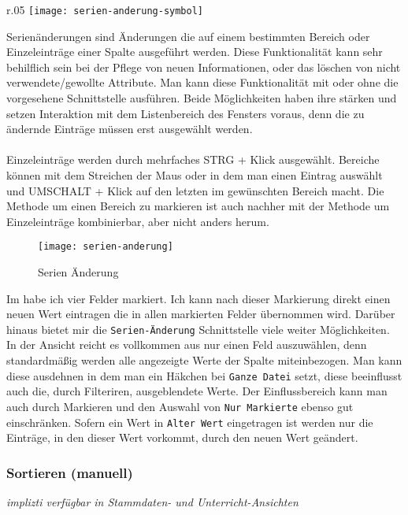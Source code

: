 \begin{wrapfigure}{r}{.05\textwidth}
	\vspace{-50pt}
	\texttt{[image: serien-anderung-symbol]}
	\vspace{-35pt}
\end{wrapfigure}

\noindent
Serienänderungen sind Änderungen die auf einem bestimmten Bereich oder Einzeleinträge einer Spalte ausgeführt werden. Diese Funktionalität kann sehr behilflich sein bei der Pflege von neuen Informationen, oder das löschen von nicht verwendete/gewollte Attribute. Man kann diese Funktionalität mit oder ohne die vorgesehene Schnittstelle ausführen. Beide Möglichkeiten haben ihre stärken und setzen Interaktion mit dem Listenbereich des Fensters voraus, denn die zu ändernde Einträge müssen erst ausgewählt werden.\\
\\
Einzeleinträge werden durch mehrfaches STRG + Klick ausgewählt. Bereiche können mit dem Streichen der Maus oder in dem man einen Eintrag auswählt und UMSCHALT + Klick auf den letzten im gewünschten Bereich macht. Die Methode um einen Bereich zu markieren ist auch nachher mit der Methode um Einzeleinträge kombinierbar, aber nicht anders herum.\\

\begin{figure}[h]
	\texttt{[image: serien-anderung]}
	\vspace{-15pt}
	\caption{Serien Änderung}
	\label{fig:serien-anderung}
\end{figure}

\noindent
Im  habe ich vier Felder markiert. Ich kann nach dieser Markierung direkt einen neuen Wert eintragen die in allen markierten Felder übernommen wird. Darüber hinaus bietet mir die \texttt{Serien-Änderung} Schnittstelle viele weiter Möglichkeiten. In der Ansicht reicht es vollkommen aus nur einen Feld auszuwählen, denn standardmäßig werden alle angezeigte Werte der Spalte miteinbezogen. Man kann diese ausdehnen in dem man ein Häkchen bei \texttt{Ganze Datei} setzt, diese beeinflusst auch die, durch Filteriren, ausgeblendete Werte. Der Einflussbereich kann man auch durch Markieren und den Auswahl von \texttt{Nur Markierte} ebenso gut einschränken. Sofern ein Wert in \texttt{Alter Wert} eingetragen ist werden nur die Einträge, in den dieser Wert vorkommt, durch den neuen Wert geändert. 

\subsubsection{Sortieren (manuell)}
{\small\textit{implizti verfügbar in Stammdaten- und Unterricht-Ansichten\\}\par}

